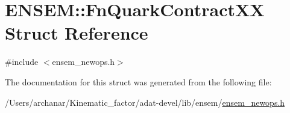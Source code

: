 \hypertarget{structENSEM_1_1FnQuarkContractXX}{}\section{E\+N\+S\+EM\+:\+:Fn\+Quark\+Contract\+XX Struct Reference}
\label{structENSEM_1_1FnQuarkContractXX}


{\ttfamily \#include $<$ensem\+\_\+newops.\+h$>$}



The documentation for this struct was generated from the following file\+:\begin{DoxyCompactItemize}
\item 
/\+Users/archanar/\+Kinematic\+\_\+factor/adat-\/devel/lib/ensem/\mbox{\hyperlink{adat-devel_2lib_2ensem_2ensem__newops_8h}{ensem\+\_\+newops.\+h}}\end{DoxyCompactItemize}
